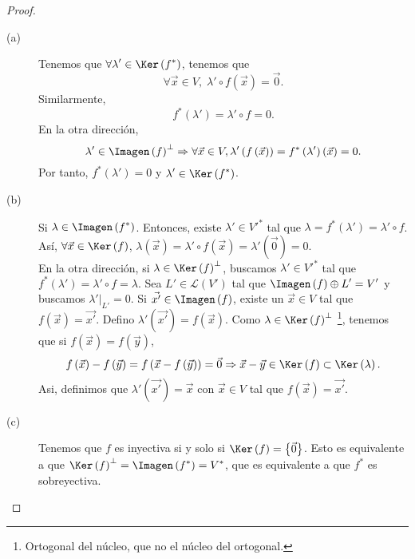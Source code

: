 \begin{proof}
\begin{description}
\item[(a)] Tenemos que $\displaystyle \forall\lambda'\in\Ker\left(f^{*}\right) $, tenemos que 
	\[\forall\vec{x}\in V, \; \lambda' \circ f\left(\vec{x}\right) = \vec{0} .\]
Similarmente, 
\[f^{*}\left(\lambda'\right) = \lambda' \circ f = 0 .\]
En la otra dirección, 
\[\lambda' \in \Imagen\left(f\right)^{\perp } \Rightarrow \forall \vec{x} \in V, \lambda'\left(f\left(\vec{x}\right)\right) = f^{*}\left(\lambda'\right)\left(\vec{x}\right) = 0 .\]
Por tanto, $\displaystyle f^{*}\left(\lambda'\right) = 0 $ y $\displaystyle \lambda' \in \Ker\left(f^{*}\right) $.
\item[(b)] Si $\displaystyle \lambda \in \Imagen\left(f^{*}\right) $. Entonces, existe $\displaystyle \lambda'\in V'^{*} $ tal que $\displaystyle \lambda = f^{*}\left(\lambda'\right) = \lambda' \circ f $. Así, $\displaystyle \forall \vec{x} \in \Ker\left(f\right) $, $\displaystyle \lambda\left(\vec{x}\right) = \lambda'\circ f\left(\vec{x}\right) = \lambda'\left(\vec{0}\right) = 0 $. \\ 
En la otra dirección, si $\displaystyle \lambda \in \Ker\left(f\right)^{\perp } $, buscamos $\displaystyle \lambda'\in V'^{*} $ tal que $\displaystyle f^{*}\left(\lambda'\right) = \lambda' \circ f=\lambda $. Sea $\displaystyle L' \in \mathcal{L}\left(V'\right) $ tal que $\displaystyle \Imagen\left(f\right) \oplus L' = V' $ y buscamos $\displaystyle \lambda'|_{L'} = 0 $. Si $\displaystyle \vec{x'} \in \Imagen\left(f\right) $, existe un $\displaystyle \vec{x}\in V $ tal que $\displaystyle f\left(\vec{x}\right) = \vec{x'} $. Defino $\displaystyle \lambda'\left(\vec{x'}\right) = f\left(\vec{x}\right) $. Como $\displaystyle \lambda \in \Ker\left(f\right)^{\perp } $ \footnote{Ortogonal del núcleo, que no el núcleo del ortogonal.}, tenemos que si $\displaystyle f\left(\vec{x}\right) = f\left(\vec{y}\right) $, 
\[f\left(\vec{x}\right)-f\left(\vec{y}\right) = f\left(\vec{x}-f\left(\vec{y}\right)\right) = \vec{0} \Rightarrow \vec{x}-\vec{y} \in \Ker\left(f\right) \subset \Ker\left(\lambda\right) .\]
Asi, definimos que $\displaystyle \lambda'\left(\vec{x'}\right) = \vec{x} $ con $\displaystyle \vec{x} \in V $ tal que $\displaystyle f\left(\vec{x}\right) = \vec{x'} $.
\item[(c)] Tenemos que $\displaystyle f $ es inyectiva si y solo si $\displaystyle \Ker\left(f\right) = \left\{ \vec{0}\right\}  $. Esto es equivalente a que $\displaystyle \Ker\left(f\right)^{\perp } = \Imagen\left(f^{*}\right) = V^{*} $, que es equivalente a que $\displaystyle f^{*} $ es sobreyectiva. 

\end{description}
\end{proof}
